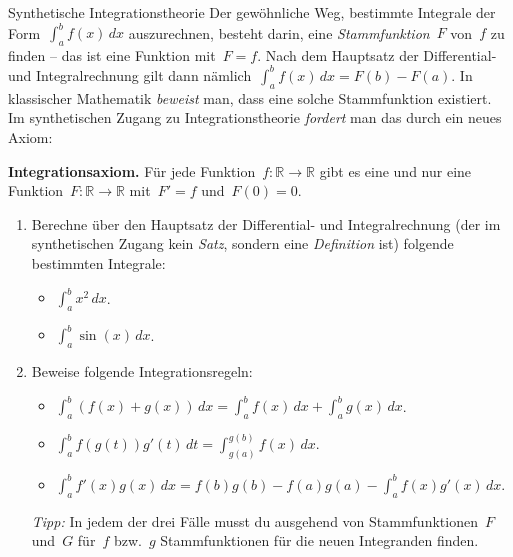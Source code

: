\documentclass[twoside]{../zirkelblatt}
\newcommand{\RR}{\mathbb{R}}
\theoremstyle{definition}
\theoremstyle{plain}
\theoremstyle{remark}
\begin{document}
\begin{aufgabeShaded}{Synthetische Integrationstheorie}
\label{aufg:integrationstheorie}
Der gewöhnliche Weg, bestimmte Integrale der Form~$\int_a^b f(x) \,dx$
auszurechnen, besteht darin, eine \emph{Stammfunktion}~$F$ von~$f$ zu finden --
das ist eine Funktion mit~$F = f$. Nach dem Hauptsatz der Differential- und
Integralrechnung gilt dann nämlich~$\int_a^b f(x) \,dx = F(b) - F(a)$. In
klassischer Mathematik \emph{beweist} man, dass eine solche Stammfunktion existiert.
Im synthetischen Zugang zu Integrationstheorie \emph{fordert} man das durch ein
neues Axiom:

\textbf{Integrationsaxiom.} Für jede Funktion~$f : \RR \to \RR$ gibt es eine
und nur eine Funktion~$F : \RR \to \RR$ mit~$F' = f$ und~$F(0) = 0$.

\begin{enumerate}
\item Berechne über den Hauptsatz der Differential- und Integralrechnung (der
im synthetischen Zugang kein \emph{Satz}, sondern eine \emph{Definition} ist)
folgende bestimmten Integrale:
\begin{itemize}
\item $\int_a^b x^2 \,dx$.
\item $\int_a^b \sin(x) \,dx$.
\end{itemize}
\item Beweise folgende Integrationsregeln:
\begin{itemize}
\item $\int_a^b (f(x) + g(x)) \,dx = \int_a^b f(x) \,dx + \int_a^b g(x) \,dx$.
\item $\int_a^b f(g(t)) g'(t) \,dt = \int_{g(a)}^{g(b)} f(x) \,dx$.
\item $\int_a^b f'(x) g(x) \,dx = f(b)g(b) - f(a)g(a) -
  \int_a^b f(x) g'(x) \,dx$.
\end{itemize}

\emph{Tipp:} In jedem der drei Fälle musst du ausgehend von Stammfunktionen~$F$
und~$G$ für~$f$ bzw.~$g$ Stammfunktionen für die neuen Integranden finden.
\end{enumerate}
\end{aufgabeShaded}


\end{document}

